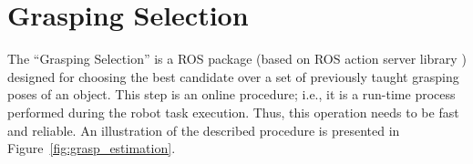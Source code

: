 

\section{Grasping Selection}
\label{cap4:modular_grasping_architecture:sec:grasp_selection}

The ``Grasping Selection'' is a \ac{ROS} package (based on \ac{ROS} action server library \cite{ros_action_lib}) designed for choosing the best candidate over a set of previously taught grasping poses of an object. This step is an online procedure; i.e., it is a run-time process performed during the robot task execution. Thus, this operation needs to be fast and reliable. An illustration of the described procedure is presented in Figure~\ref{fig:grasp_estimation}. 




